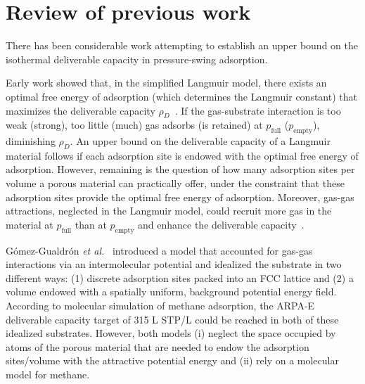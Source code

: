 \documentclass[twoside,twocolumn,9pt]{article}
\newcommand\pfull{\ensuremath{p_{\text{full}}}}
\newcommand\pempty{\ensuremath{p_{\text{empty}}}}
\begin{document}
\section{Review of previous work}
There has been considerable work attempting to establish an upper bound on the
isothermal deliverable capacity in pressure-swing adsorption.

Early work showed that, in the simplified Langmuir model, there exists an
optimal free energy of adsorption (which determines the Langmuir constant) that
maximizes the deliverable capacity
$\rho_D$~\cite{matranga1992storage,bhatia2006optimum,simon2014optimizing}. If
the gas-substrate interaction is too weak (strong), too little (much) gas
adsorbs (is retained) at $\pfull$ ($\pempty$), diminishing $\rho_D$. An upper
bound on the deliverable capacity of a Langmuir material follows if each
adsorption site is endowed with the optimal free energy of adsorption. However,
remaining is the question of how many adsorption sites per volume a porous
material can practically offer, under the constraint that these adsorption
sites provide the optimal free energy of adsorption. Moreover, gas-gas
attractions, neglected in the Langmuir model, could recruit more gas in the
material at $\pfull$ than at $\pempty$ and enhance the deliverable
capacity~\cite{simon2014optimizing}.

G\'omez-Gualdr\'on \emph{et al.}~\cite{gomez2017impact} introduced a model that
accounted for gas-gas interactions via an intermolecular potential and
idealized the substrate in two different ways: (1) discrete adsorption sites
packed into an FCC lattice and (2) a volume endowed with a spatially uniform,
background potential energy field. According to molecular simulation of methane
adsorption, the ARPA-E deliverable capacity target of 315 L STP/L could be
reached in both of these idealized substrates. However, both models (i)
neglect the space occupied by atoms of the porous material that are needed to
endow the adsorption sites/volume with the attractive potential energy and (ii)
rely on a molecular model for methane.
\end{document}
